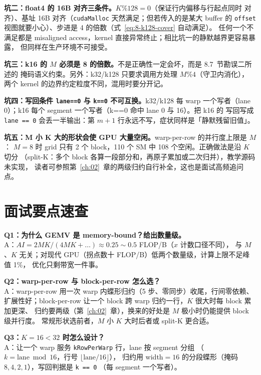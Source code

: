 \textbf{坑二：float4 的 16B 对齐三条件。}$K \% 128 = 0$（保证行内偏移与行起点同时
对齐）、基址 16B 对齐（\texttt{cudaMalloc} 天然满足；但若传入的是某大 buffer 的
\texttt{offset} 视图就要小心）、步进是 4 的倍数（式~\ref{eq:8-k128-cover} 自动满足）。
任何一个不满足都是 misaligned access，kernel 直接异常终止；相比坑一的静默越界更容易暴露，
但同样在生产环境不可接受。

\textbf{坑三：k16 的 $M$ 必须是 8 的倍数。}不是正确性一定会坏，而是 8.7~节勘误二所述的
掩码语义约束。另外：k32/k128 只要求调用方处理 $M \% 4$（守卫内消化），
两个 kernel 的边界约定粒度不同，混用时要分开记。

\textbf{坑四：写回条件 \texttt{lane==0} 与 \texttt{k==0} 不可互换。}\allowbreak{}k32/k128 每 warp
一个写者（lane 0）；k16 每个 segment 一个写者（k==0 命中 lane 0 与 16）。把 k16 的
写回写成 \texttt{lane == 0} 会丢一半输出：第 $m+1$ 行永远不写，症状同样是「静默残留旧值」。

\textbf{坑五：M 小 K 大的形状会使 GPU 大量空闲。}\allowbreak{}warp-per-row 的并行度上限是 $M$：
$M = 8$ 时 grid 只有 2 个 block，110 个 SM 中 108 个空闲。正确做法是沿 $K$ 切分
（split-K：多个 block 各算一段部分和，再原子累加或二次归并），教学源码未实现，
读者可参照第~\ref{ch:02}~章的两级归约自行补全，这也是面试高频追问点。

\section{面试要点速查}

\textbf{Q1：为什么 GEMV 是 memory-bound？给出数量级。}\\
A：$AI = 2MK / (4MK + \dots) \approx 0.25 \sim 0.5$ FLOP/B（$x$ 计数口径不同），
与 $M$、$K$ 无关；对现代 GPU（拐点数十 FLOP/B）低两个数量级，计算上限不足峰值 1\%，
优化只剩带宽一件事。

\textbf{Q2：warp-per-row 与 block-per-row 怎么选？}\\
A：warp-per-row 用一次 warp 内蝶形归约（5 步、零同步）收尾，行间零依赖、
扩展性好；block-per-row 让一个 block 跨 warp 归约一行，$K$ 很大时每 block 累加更深、
归约要两级（第~\ref{ch:02}~章），换来的好处是 $M$ 极小时仍能提供 block 级并行度。
常规形状选前者，$M$ 小 $K$ 大时后者或 split-K 更合适。

\textbf{Q3：$K = 16 < 32$ 时怎么设计？}\\
A：让一个 warp 服务 \texttt{kRowPerWarp} 行，lane 按 segment 分组
（$k = \mathrm{lane} \bmod 16$，行号 $\lfloor \mathrm{lane}/16 \rfloor$），
归约用 width$=16$ 的分段蝶形（掩码 $8,4,2,1$），写回判据是 \texttt{k == 0}
（每 segment 一个写者）。


